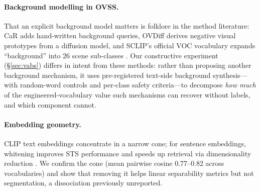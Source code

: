 \documentclass[11pt]{article}
\begin{document}
\paragraph{Background modelling in OVSS.} That an explicit background model matters
is folklore in the method literature: CaR \citep{sun2024car} adds hand-written
background queries, OVDiff \citep{karazija2024ovdiff} derives negative visual
prototypes from a diffusion model, and SCLIP's official VOC vocabulary expands
``background'' into 26 scene sub-classes \citep{wang2024sclip}. Our constructive
experiment (\S\ref{sec:vabs}) differs in intent from these methods: rather than
proposing another background mechanism, it uses pre-registered text-side background
synthesis---with random-word controls and per-class safety criteria---to decompose
\emph{how much} of the engineered-vocabulary value such mechanisms can recover
without labels, and which component cannot.

\paragraph{Embedding geometry.} CLIP text embeddings concentrate in a narrow cone;
for sentence embeddings, whitening improves STS performance and speeds up retrieval
via dimensionality reduction \citep{su2021whitening}. We confirm the cone
(mean pairwise cosine 0.77--0.82 across vocabularies) and show that removing it helps
linear separability metrics but not segmentation, a dissociation previously unreported.
\end{document}
